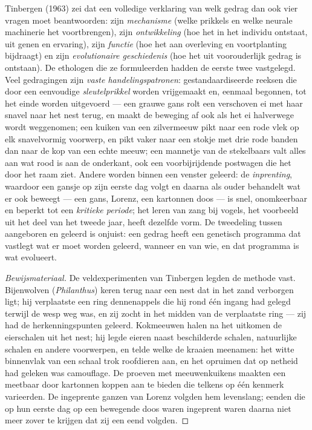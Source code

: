 \begin{definition}\label{def:b3:behavioural-ecology:tinbergen}
Tinbergen (1963) zei dat een volledige verklaring van welk gedrag dan
ook vier vragen moet beantwoorden: zijn \emph{mechanisme} (welke
prikkels en welke neurale machinerie het voortbrengen), zijn
\emph{ontwikkeling} (hoe het in het individu ontstaat, uit genen en
ervaring), zijn \emph{functie} (hoe het aan overleving en voortplanting
bijdraagt) en zijn \emph{evolutionaire geschiedenis} (hoe het uit
voorouderlijk gedrag is ontstaan). De ethologen die ze formuleerden
hadden de eerste twee vastgelegd. Veel gedragingen zijn \emph{vaste
handelingspatronen}: gestandaardiseerde reeksen die door een eenvoudige
\emph{sleutelprikkel} worden vrijgemaakt en, eenmaal begonnen, tot het
einde worden uitgevoerd --- een grauwe gans rolt een verschoven ei met
haar snavel naar het nest terug, en maakt de beweging af ook als het ei
halverwege wordt weggenomen; een kuiken van een zilvermeeuw pikt naar
een rode vlek op elk snavelvormig voorwerp, en pikt vaker naar een
stokje met drie rode banden dan naar de kop van een echte meeuw; een
mannetje van de stekelbaars valt alles aan wat rood is aan de
onderkant, ook een voorbijrijdende postwagen die het door het raam
ziet. Andere worden binnen een venster geleerd: de \emph{inprenting},
waardoor een gansje op zijn eerste dag volgt en daarna als ouder
behandelt wat er ook beweegt --- een gans, Lorenz, een kartonnen doos
--- is snel, onomkeerbaar en beperkt tot een \emph{kritieke periode};
het leren van zang bij vogels, het voorbeeld uit het deel van het
tweede jaar, heeft dezelfde vorm. De tweedeling tussen aangeboren en
geleerd is onjuist: een gedrag heeft een genetisch programma dat
vastlegt wat er moet worden geleerd, wanneer en van wie, en dat
programma is wat evolueert.
\end{definition}

\begin{proof}[Bewijsmateriaal]
De veldexperimenten van Tinbergen legden de methode vast. Bijenwolven
(\emph{Philanthus}) keren terug naar een nest dat in het zand verborgen
ligt; hij verplaatste een ring dennenappels die hij rond één ingang had
gelegd terwijl de wesp weg was, en zij zocht in het midden van de
verplaatste ring --- zij had de herkenningspunten geleerd. Kokmeeuwen
halen na het uitkomen de eierschalen uit het nest; hij legde eieren
naast beschilderde schalen, natuurlijke schalen en andere voorwerpen,
en telde welke de kraaien meenamen: het witte binnenvlak van een schaal
trok roofdieren aan, en het opruimen dat op netheid had geleken was
camouflage. De proeven met meeuwenkuikens maakten een 
meetbaar door kartonnen koppen aan te bieden die telkens op één kenmerk
varieerden. De ingeprente ganzen van Lorenz volgden hem levenslang;
eenden die op hun eerste dag op een bewegende doos waren ingeprent
waren daarna niet meer zover te krijgen dat zij een eend volgden.
\end{proof}

